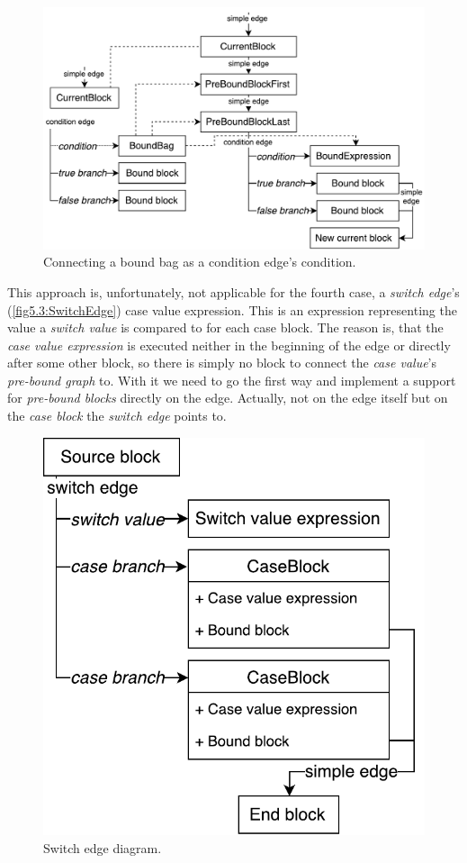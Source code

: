 \begin{figure}[h]
	\centering	
	\includegraphics[scale=0.70]{../img/5_3_newInIfEdge}	
	\caption{Connecting a bound bag as a condition edge's condition.}
	\label{fig5.3:BindIfEdge}
\end{figure}

This approach is, unfortunately, not applicable for the fourth case, a \emph{switch edge}’s (\autoref{fig5.3:SwitchEdge}) case value expression. This is an expression representing the value a \emph{switch value} is compared to for each case block. The reason is, that the \emph{case value expression} is executed neither in the beginning of the edge or directly after some other block, so there is simply no block to connect the \emph{case value}’s \emph{pre-bound graph} to. With it we need to go the first way and implement a support for \emph{pre-bound blocks} directly on the edge. Actually, not on the edge itself but on the \emph{case block} the \emph{switch edge} points to.

\begin{figure}[h]
	\centering	
	\includegraphics[scale=0.75]{../img/5_3_switchEdge}	
	\caption{Switch edge diagram.}
	\label{fig5.3:SwitchEdge}
\end{figure}

